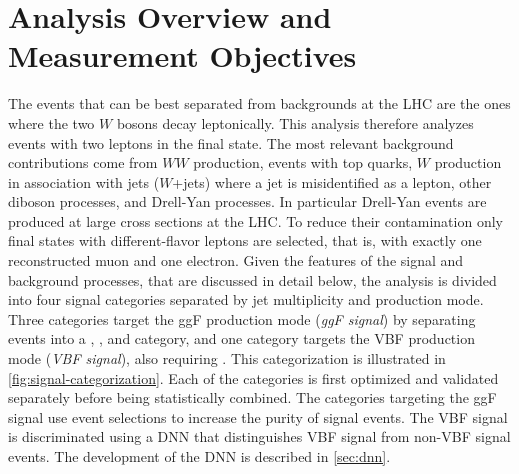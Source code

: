 

\section{Analysis Overview and Measurement Objectives}
\label{sec:analysis-overview}
The \HWW events that can be best separated from backgrounds at the LHC are the ones where the two $W$ bosons decay leptonically.
This analysis therefore analyzes events with two leptons in the final state. 
The most relevant background contributions come from $WW$ production, events with top quarks, $W$ production in association with jets ($W$+jets) where a jet is misidentified as a lepton, other diboson processes, and Drell-Yan processes. In particular Drell-Yan events are produced at large cross sections at the LHC. To reduce their contamination only final states with different-flavor leptons are selected, that is, with exactly one reconstructed muon and one electron.
Given the features of the signal and background processes, that are discussed in detail below, the analysis is divided into four signal categories separated by jet multiplicity and production mode.
Three categories target the ggF production mode (\emph{ggF signal}) by separating events into a \ZeroJet, \OneJet, and \TwoJet category, and one category targets the VBF production mode (\emph{VBF signal}), also requiring \TwoJet. 
This categorization is illustrated in \cref{fig:signal-categorization}. 
Each of the categories is first optimized and validated separately before being statistically combined. 
The categories targeting the ggF signal use event selections to increase the purity of signal events. 
The VBF signal is discriminated using a DNN that distinguishes VBF signal from non-VBF signal events. 
The development of the DNN is described in \cref{sec:dnn}. 
